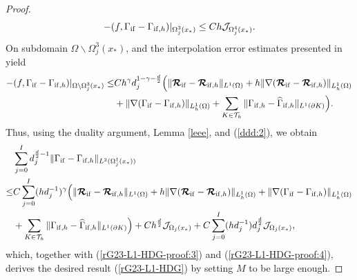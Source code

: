 \documentclass[1996/10/24]{amsart}
\theoremstyle{definition}
\numberwithin{equation}{section}
\begin{document}
\begin{proof}
\begin{align*}
-(f,\Gamma_{{\rm if}}-\Gamma_{{\rm if},h})|_{\Omega_j^3(x_{\ast})}\leq Ch\mathcal{J}_{\Omega_j^4(x_{\ast})}.
\end{align*}
On subdomain $\Omega\backslash\Omega_j^3(x_{\ast})$, \cite[Lemma 3.8]{lc2026} and the interpolation error estimates presented in \cite[Lemma 4.1]{glrs2009} yield
\begin{align*}
-(f,\Gamma_{{\rm if}}-\Gamma_{{\rm if},h})|_{\Omega\backslash\Omega_j^3(x_{\ast})}\leq& Ch^{\gamma}d_j^{1-\gamma-\frac{d}{2}}\Big(\|\boldsymbol{\mathcal{R}}_{{\rm if}}-\boldsymbol{\mathcal{R}}_{{\rm if},h}\|_{L^1(\Omega)}+h\|\nabla(\boldsymbol{\mathcal{R}}_{{\rm if}}-\boldsymbol{\mathcal{R}}_{{\rm if},h})\|_{L_h^1(\Omega)}\\
&+\|\nabla(\Gamma_{{\rm if}}-\Gamma_{{\rm if},h})\|_{L_h^1(\Omega)}+\sum_{K\in\mathcal{T}_h}\|\Gamma_{{\rm if},h}-\widehat{\Gamma}_{{\rm if},h}\|_{L^1(\partial K)}\Big).
\end{align*}
Thus, using the duality argument, Lemma \ref{leee}, and (\ref{ddd:2}), we obtain
\begin{align*}
&\sum_{j=0}^Id_j^{\frac{d}{2}-1}\|\Gamma_{{\rm if}}-\Gamma_{{\rm if},h}\|_{L^2(\Omega_j^1(x_{\ast}))}\\
\leq& C\sum_{j=0}^I(hd_j^{-1})^{\gamma}\Big(\|\boldsymbol{\mathcal{R}}_{{\rm if}}-\boldsymbol{\mathcal{R}}_{{\rm if},h}\|_{L^1(\Omega)}+h\|\nabla(\boldsymbol{\mathcal{R}}_{{\rm if}}-\boldsymbol{\mathcal{R}}_{{\rm if},h})\|_{L_h^1(\Omega)}+\|\nabla(\Gamma_{{\rm if}}-\Gamma_{{\rm if},h})\|_{L_h^1(\Omega)}\\
&+\sum_{K\in\mathcal{T}_h}\|\Gamma_{{\rm if},h}-\widehat{\Gamma}_{{\rm if},h}\|_{L^1(\partial K)}\Big)+Ch^{\frac{d}{2}}\mathcal{J}_{\Omega_j(x_{\ast})}+C\sum_{j=0}^I(hd_j^{-1})d_j^{\frac{d}{2}}\mathcal{J}
_{\Omega_j(x_{\ast})},
\end{align*}
which, together with (\ref{rG23-L1-HDG-proof:3}) and (\ref{rG23-L1-HDG-proof:4}), derives the desired result (\ref{rG23-L1-HDG}) by setting
$M$ to be large enough.
\end{proof}
\end{document}
